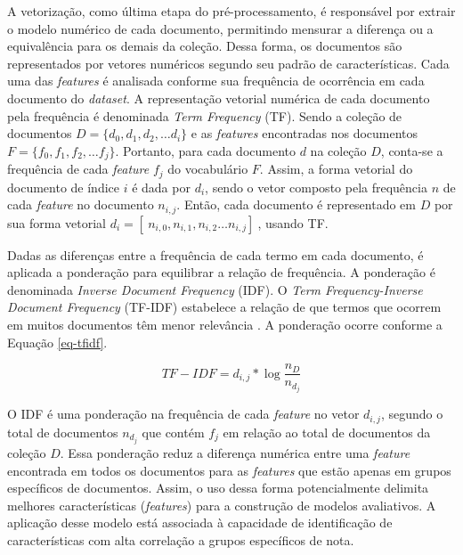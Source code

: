A vetorização, como última etapa do pré-processamento, é responsável por extrair o modelo numérico de cada documento, permitindo mensurar a diferença ou a equivalência para os demais da coleção. Dessa forma, os documentos são representados por vetores numéricos segundo seu padrão de características. Cada uma das \textit{features} é analisada conforme sua frequência de ocorrência em cada documento do \textit{dataset}. A representação vetorial numérica de cada documento pela frequência é denominada \textit{Term Frequency} (TF). Sendo a coleção de documentos $ D = \{ d_{0}, d_{1}, d_{2}, \hdots d_{i} \} $ e as \textit{features} encontradas nos documentos $ F = \{ f_{0}, f_{1}, f_{2}, \hdots f_{j} \} $.  Portanto, para cada documento $ d $ na coleção $ D $, conta-se a frequência de cada \textit{feature} $ f_{j} $ do vocabulário $ F $. Assim, a forma vetorial do documento de índice $ i $ é dada por $ d_{i} $, sendo o vetor composto pela frequência $ n $ de cada \textit{feature} no documento $ n_{i, j} $. Então, cada documento é representado em $ D $ por sua forma vetorial $ d_{i} = [\ n_{i, 0}, n_{i, 1}, n_{i, 2} \hdots n_{i,j} ]\ $, usando TF.

Dadas as diferenças entre a frequência de cada termo em cada documento, é aplicada a ponderação para equilibrar a relação de frequência. A ponderação é denominada \textit{Inverse Document Frequency} (IDF). O \textit{Term Frequency-Inverse Document Frequency} (TF-IDF) estabelece a relação de que termos que ocorrem em muitos documentos têm menor relevância \cite{baeza2011}. A ponderação ocorre conforme a Equação \ref{eq-tfidf}.

\begin{equation}
TF-IDF = d_{i,j}* \log \frac{n_{D}}{n_{d_{j}}}
\label{eq-tfidf}
\end{equation}

O IDF é uma ponderação na frequência de cada \textit{feature} no vetor $ d_{i, j} $, segundo o total de documentos $ n_{d_{j}} $ que contém $ f_{j} $ em relação ao total de documentos da coleção $ D $. Essa ponderação reduz a diferença numérica entre uma \textit{feature} encontrada em todos os documentos para as \textit{features} que estão apenas em grupos específicos de documentos. Assim, o uso dessa forma potencialmente delimita melhores características (\textit{features}) para a construção de modelos avaliativos. A aplicação desse modelo está associada à capacidade de identificação de características com alta correlação a grupos específicos de nota.

